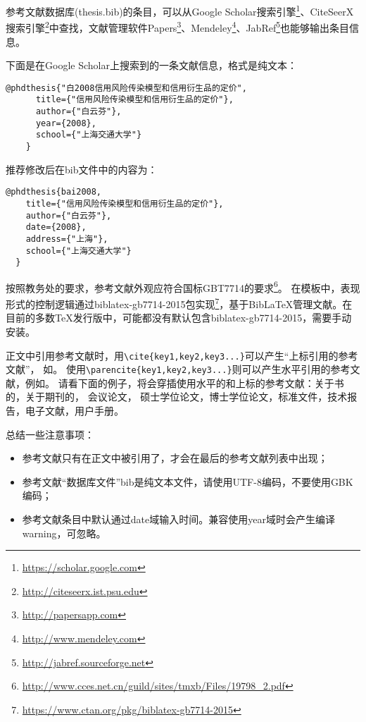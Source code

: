 参考文献数据库(thesis.bib)的条目，可以从Google Scholar搜索引擎\footnote{\url{https://scholar.google.com}}、CiteSeerX搜索引擎\footnote{\url{http://citeseerx.ist.psu.edu}}中查找，文献管理软件Papers\footnote{\url{http://papersapp.com}}、Mendeley\footnote{\url{http://www.mendeley.com}}、JabRef\footnote{\url{http://jabref.sourceforge.net}}也能够输出条目信息。

下面是在Google Scholar上搜索到的一条文献信息，格式是纯文本：

\begin{lstlisting}[caption={从Google Scholar找到的参考文献条目}, label=googlescholar, escapeinside="", numbers=none]
    @phdthesis{"白2008信用风险传染模型和信用衍生品的定价",
      title={"信用风险传染模型和信用衍生品的定价"},
      author={"白云芬"},
      year={2008},
      school={"上海交通大学"}
    }
\end{lstlisting}

推荐修改后在bib文件中的内容为：

\begin{lstlisting}[caption={修改后的参考文献条目}, label=itemok, escapeinside="", numbers=none]
  @phdthesis{bai2008,
    title={"信用风险传染模型和信用衍生品的定价"},
    author={"白云芬"},
    date={2008},
    address={"上海"},
    school={"上海交通大学"}
  }
\end{lstlisting}

按照教务处的要求，参考文献外观应符合国标GBT7714的要求\footnote{\url{http://www.cces.net.cn/guild/sites/tmxb/Files/19798_2.pdf}}。
在模板中，表现形式的控制逻辑通过biblatex-gb7714-2015包实现\footnote{\url{https://www.ctan.org/pkg/biblatex-gb7714-2015}}，基于{Bib\LaTeX}管理文献。在目前的多数TeX发行版中，可能都没有默认包含biblatex-gb7714-2015，需要手动安装。

正文中引用参考文献时，用\verb+\cite{key1,key2,key3...}+可以产生“上标引用的参考文献”，
如\cite{Meta_CN,chen2007act,DPMG}。
使用\verb+\parencite{key1,key2,key3...}+则可以产生水平引用的参考文献，例如\parencite{JohnD,zhubajie,IEEE-1363}。
请看下面的例子，将会穿插使用水平的和上标的参考文献：关于书的\parencite{Meta_CN,JohnD,IEEE-1363}，关于期刊的\cite{chen2007act,chen2007ewi}，
会议论文\parencite{DPMG,kocher99,cnproceed}，
硕士学位论文\parencite{zhubajie,metamori2004}，博士学位论文\cite{shaheshang,FistSystem01,bai2008}，标准文件\parencite{IEEE-1363}，技术报告\cite{NPB2}，电子文献\parencite{xiaoyu2001, CHRISTINE1998}，用户手册\parencite{RManual}。

总结一些注意事项：
\begin{itemize}
\item 参考文献只有在正文中被引用了，才会在最后的参考文献列表中出现；
\item 参考文献“数据库文件”bib是纯文本文件，请使用UTF-8编码，不要使用GBK编码；
\item 参考文献条目中默认通过date域输入时间。兼容使用year域时会产生编译warning，可忽略。
\end{itemize}

